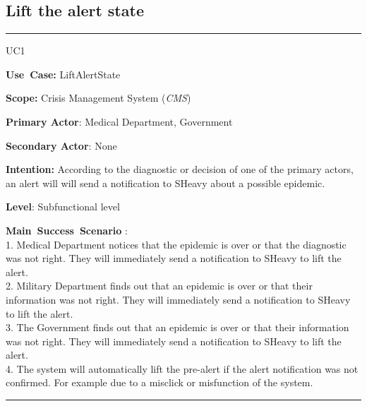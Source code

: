 \subsection{Lift the alert state}
\vspace{0.5cm}
\hrule
\vspace{0.5cm}
\begin{lyxlist}{UC1}
\small{
\item [\textbf{Use~Case:}] LiftAlertState
\item [\textbf{Scope:}] Crisis Management System (\emph{CMS})
\item [\textbf{Primary Actor}:] Medical Department, Government
\item [\textbf{Secondary Actor}:] None
\item [\textbf{Intention:}] According to the diagnostic or decision of one of
the primary actors, an alert will will send a notification to SHeavy about a
possible epidemic.
\item [\textbf{Level}:]Subfunctional level
\item [\textbf{Main~Success~Scenario}]:\\
1. Medical Department notices that the epidemic is over or that the
diagnostic was not right. They will immediately send a notification to SHeavy
to lift the alert.\\
2. Military Department finds out that an epidemic is over or that their
information was not right. They will immediately send a notification to SHeavy
to lift the alert.\\
3. The Government finds out that an epidemic is over or that their
information was not right. They will immediately send a notification to SHeavy
to lift the alert.\\
4. The system will automatically lift the pre-alert if the alert notification
was not confirmed. For example due to a misclick or misfunction of the system.\\
}
\end{lyxlist}
\hrule
\vspace{0.5cm} 

